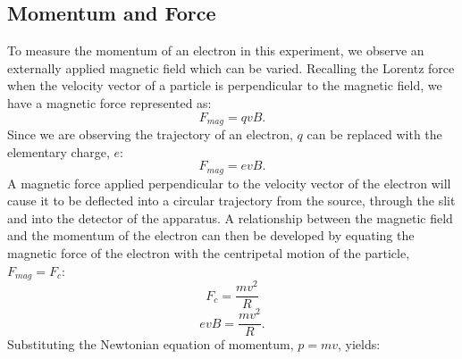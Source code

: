 \subsection{Momentum and Force}
To measure the momentum of an electron in this experiment, we observe an externally applied magnetic field which can be varied. Recalling the Lorentz force when the velocity vector of a particle is perpendicular to the magnetic field, we have a magnetic force represented as:
\begin{equation} F_{mag}=qvB. \end {equation}
Since we are observing the trajectory of an electron, $q$ can be replaced with the elementary charge, $e$: 
\begin{equation} F_{mag}=evB.\end{equation}
A magnetic force applied perpendicular to the velocity vector of the electron will cause it to be deflected into a circular trajectory from the source, through the slit and into the detector of the apparatus. A relationship between the magnetic field and the momentum of the electron can then be developed by equating the magnetic force of the electron with the centripetal motion of the particle,$F_{mag}=F_c$:
\begin{equation} F_c=\frac{mv^2}{R}\end{equation}
\begin{equation} evB=\frac{mv^2}{R}.\end {equation}
Substituting the Newtonian equation of momentum, $p=mv$, yields:

